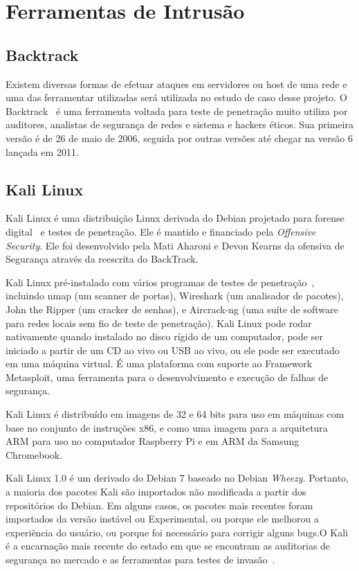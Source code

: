 \section{Ferramentas de Intrusão}

\subsection{Backtrack}
Existem diversas formas de efetuar ataques em servidores ou host de uma rede e uma das ferramentar utilizadas será utilizada no estudo de caso desse projeto. O Backtrack~\cite{giavaroto} é uma ferramenta voltada para teste de penetração muito utiliza por auditores, analistas de segurança de redes e sistema e hackers éticos. Sua primeira versão é de 26 de maio de 2006, seguida por outras versões até chegar na versão 6 lançada em 2011.



\subsection{Kali Linux}
Kali Linux é uma distribuição Linux  derivada do Debian projetado para forense digital~\cite{broad} e testes de penetração. Ele é mantido e financiado pela \emph{ Offensive Security}. Ele foi desenvolvido pela Mati Aharoni e Devon Kearns da ofensiva de Segurança através da reescrita do BackTrack.

Kali Linux pré-instalado com vários programas de testes de penetração~\cite{lakhani}, incluindo nmap (um scanner de portas), Wireshark (um analisador de pacotes), John the Ripper (um cracker de senhas), e Aircrack-ng (uma suíte de software para redes locais sem fio de teste de penetração). Kali Linux pode rodar nativamente quando instalado no disco rígido de um computador, pode ser iniciado a partir de um CD ao vivo ou USB ao vivo, ou ele pode ser executado em uma máquina virtual. É uma plataforma com suporte ao Framework Metasploit, uma ferramenta para o desenvolvimento e execução de falhas de segurança.

Kali Linux é distribuído em imagens de 32 e 64 bits  para uso em máquinas com base no conjunto de instruções x86, e como uma imagem para a arquitetura ARM para uso no computador Raspberry Pi e em ARM da Samsung Chromebook.

Kali Linux 1.0 é um derivado do Debian 7 baseado no Debian \emph{Wheezy}. Portanto, a maioria dos pacotes Kali são importados não modificada a partir dos repositórios do Debian. Em alguns casos, os pacotes mais recentes foram importados da versão instável ou Experimental, ou porque ele melhorou a experiência do usuário, ou porque foi necessário para corrigir alguns bugs.O Kali é a encarnação mais recente do estado em que se encontram as auditorias de segurança no mercado e as ferramentas para testes de invasão~\cite{broad}.


